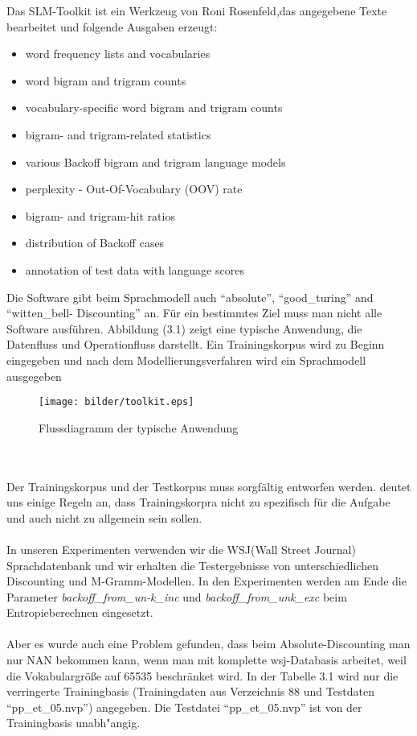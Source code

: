 Das SLM-Toolkit ist ein Werkzeug von Roni Rosenfeld,das angegebene Texte bearbeitet und folgende Ausgaben erzeugt\cite{int_slm_toolkit}:
\begin{itemize}
	\item word frequency lists and vocabularies
	\item word bigram and trigram counts
	\item vocabulary-specific word bigram and trigram counts
	\item bigram- and trigram-related statistics
	\item various Backoff bigram and trigram language models
	\item perplexity - Out-Of-Vocabulary (OOV) rate 
	\item bigram- and trigram-hit ratios
	\item distribution of Backoff cases 
	\item annotation of test data with language scores 
\end{itemize}
Die Software gibt beim Sprachmodell auch "`absolute"', "`good\_turing"' and "`witten\_bell- Discounting"' an.
F\"ur ein bestimmtes Ziel muss man nicht alle Software ausf\"uhren. Abbildung (3.1) zeigt eine typische Anwendung, die Datenfluss und Operationfluss darstellt.
Ein Trainingskorpus wird zu Beginn eingegeben und nach dem Modellierungsverfahren wird ein Sprachmodell ausgegeben
\begin{figure}[h]
	\texttt{[image: bilder/toolkit.eps]}
	 \caption{Flussdiagramm der typische Anwendung}
  \label{fig:figure_2}
\end{figure}
\\
\\
Der Trainingskorpus und der Testkorpus muss sorgf\"altig entworfen werden. \cite{book_speech} deutet uns einige Regeln an, dass Trainingskorpra nicht zu spezifisch f\"ur die Aufgabe und auch nicht zu allgemein sein sollen.  
\\
\\
In unseren Experimenten verwenden wir die WSJ(Wall Street Journal) Sprachdatenbank und wir erhalten die Testergebnisse von unterschiedlichen Discounting und M-Gramm-Modellen. In den Experimenten werden am Ende die Parameter \emph{backoff\_from\_un-k\_inc} und \emph{backoff\_from\_unk\_exc} beim Entropieberechnen eingesetzt.
\\
\\  
Aber es wurde auch eine Problem gefunden, dass beim Absolute-Discounting man nur NAN bekommen kann, wenn man mit komplette wsj-Databasis arbeitet, weil die Vokabulargr\"o\ss e auf 65535 beschr\"anket wird. In der Tabelle 3.1 wird nur die verringerte Trainingbasis (Trainingdaten aus Verzeichnis 88 und Testdaten "`pp\_et\_05.nvp"') angegeben. Die Testdatei "`pp\_et\_05.nvp"' ist von der Trainingbasis unabh"angig.
